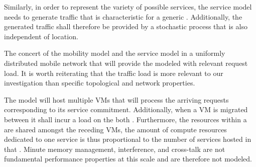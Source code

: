 Similarly, in order to represent the variety of possible services, the service model needs to generate traffic that is characteristic for a generic \ue{}. Additionally, the generated traffic shall therefore be provided by a stochastic process that is also independent of location.

The concert of the mobility model and the service model in a uniformly distributed mobile network that will provide the modeled \dcs{} with relevant request load. It is worth reiterating that the traffic load is more relevant to our investigation than specific topological and network properties.

The \dc{} model will host multiple VMs that will process the arriving requests corresponding to its service commitment. Additionally, when a VM is migrated between \dcs{} it shall incur a load on the both \dcs{}. Furthermore, the resources within a \dc{} are shared amongst the receding VMs, the amount of compute resources dedicated to one service is thus proportional to the number of services hosted in that \dc{}.  Minute memory management, interference, and cross-talk are not fundamental performance properties at this scale and are therefore not modeled.